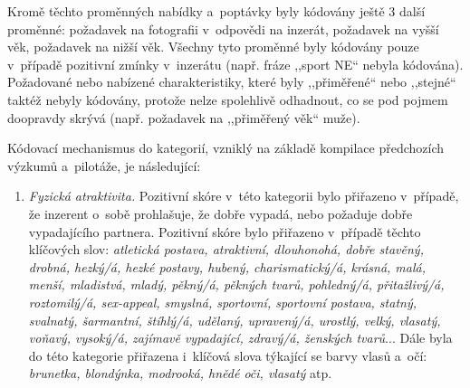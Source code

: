 \documentclass[a4paper, 12pt, notitlepage, oneside, numbers=noenddot]{report}
\begin{document}
Kromě těchto proměnných nabídky a~poptávky byly kódovány ještě 3
další proměnné: požadavek na fotografii v~odpovědi na inzerát,
požadavek na vyšší věk, požadavek na nižší věk. Všechny tyto
proměnné byly kódovány pouze v~případě pozitivní zmínky v~inzerátu
(např. fráze ,,sport NE`` nebyla kódována). Požadované nebo
nabízené charakteristiky, které byly ,,přiměřené`` nebo ,,stejné``
taktéž nebyly kó\-do\-vá\-ny, protože nelze spolehlivě odhadnout, co
se pod pojmem doopravdy skrývá (např. požadavek na ,,přiměřený věk``
muže).

Kódovací mechanismus do kategorií, vzniklý na základě kompilace předchozích výzkumů
a~pilotáže, je následující:

\begin{enumerate}
\item \emph{Fyzická atraktivita.} Pozitivní skóre v~této kategorii
  bylo přiřazeno v~případě, že inzerent o~sobě prohlašuje, že dobře
  vypadá, nebo požaduje dobře vypadajícího partnera. Pozitivní skóre
  bylo přiřazeno v~případě těchto klíčových slov:
  \emph{atletická postava, atraktivní, dlouhonohá, dobře stavěný,
    drobná, hezký/á, hezké postavy, hubený, charismatický/á, krásná,
    malá, menší, mladistvá, mladý, pěkný/á, pěkných tvarů, pohledný/á,
    přitažlivý/á, roztomilý/á, sex-appeal, smyslná, sportovní,
    sportovní postava, statný, svalnatý, šarmantní, štíhlý/á, udělaný,
    upravený/á, u\-rost\-lý, velký, vlasatý, voňavý, vysoký/á, zajímavě
    vypadající, zdravý/á, ženských tvarů}...  Dále byla do této
  kategorie přiřazena i~klíčová slova týkající se barvy vlasů a~očí:
  \emph{brunetka, blondýnka, modrooká, hnědé oči, vlasatý} atp.


\end{enumerate}
\end{document}
